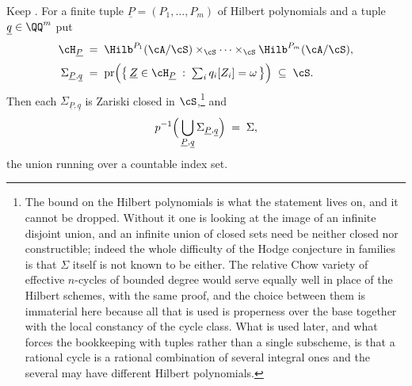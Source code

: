 \begin{theorem}\label{thm:closedlocus}
Keep . For a finite tuple $\underline{P}=(P_{1},\dots
,P_{m})$ of Hilbert polynomials and a tuple $\underline{q}\in\QQ^{m}$ put
\begin{align*}
  \cH_{\underline{P}}
  &\;=\;
  \Hilb^{P_{1}}(\cA/\cS)\times_{\cS}\cdots\times_{\cS}\Hilb^{P_{m}}(\cA/\cS),
  \\[2pt]
  \Sigma_{\underline{P},\underline{q}}
  &\;=\;
  \mathrm{pr}\Bigl(\bigl\{\,\underline{Z}\in\cH_{\underline{P}}
    \;:\;\textstyle\sum_{i}q_{i}[Z_{i}]=\omega\,\bigr\}\Bigr)
  \;\subseteq\;\cS .
\end{align*}
Then each $\Sigma_{\underline{P},\underline{q}}$ is Zariski closed in
$\cS$,\footnote{The bound on the Hilbert polynomials is what the statement
lives on, and it cannot be dropped. Without it one is looking at the image of
an infinite disjoint union, and an infinite union of closed sets need be
neither closed nor constructible; indeed the whole difficulty of the Hodge
conjecture in families is that $\Sigma$ itself is not known to be either. The
relative Chow variety of effective $n$-cycles of bounded degree would serve
equally well in place of the Hilbert schemes, with the same proof, and the
choice between them is immaterial here because all that is used is properness
over the base together with the local constancy of the cycle class. What is
used later, and what forces the bookkeeping with tuples rather than a single
subscheme, is that a rational cycle is a rational combination of several
integral ones and the several may have different Hilbert polynomials.} and
\[
  p^{-1}\Bigl(\,\bigcup_{\underline{P},\underline{q}}
    \Sigma_{\underline{P},\underline{q}}\Bigr)\;=\;\Sigma ,
\]
the union running over a countable index set.
\end{theorem}

